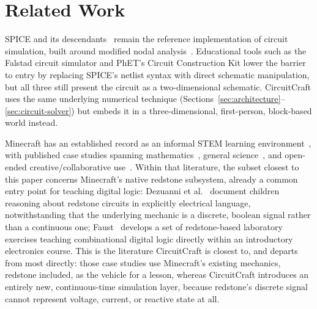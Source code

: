 \section{Related Work}
\label{sec:related-work}

SPICE and its descendants~\cite{nagel1973spice} remain the reference implementation of
circuit simulation, built around modified nodal analysis~\cite{ho1975mna}. Educational tools
such as the Falstad circuit simulator and PhET's Circuit Construction Kit lower the barrier
to entry by replacing SPICE's netlist syntax with direct schematic manipulation, but all
three still present the circuit as a two-dimensional schematic. CircuitCraft uses the same
underlying numerical technique (Sections~\ref{sec:architecture}--\ref{sec:circuit-solver})
but embeds it in a three-dimensional, first-person, block-based world instead.

Minecraft has an established record as an informal STEM learning
environment~\cite{nebel2016mining,sitzmann2011meta}, with published case studies spanning
mathematics~\cite{bos2014mathematics}, general science~\cite{short2012teaching}, and
open-ended creative/collaborative use~\cite{cipollone2014creative,callaghan2016investigating}.
Within that literature, the subset closest to this paper concerns Minecraft's native redstone
subsystem, already a common entry point for teaching digital logic: Dezuanni et
al.~\cite{dezuanni2015redstone} document children reasoning about redstone circuits in
explicitly electrical language, notwithstanding that the underlying mechanic is a discrete,
boolean signal rather than a continuous one; Faust~\cite{faust2024minecraft} develops a set of
redstone-based laboratory exercises teaching combinational digital logic directly within an
introductory electronics course. This is the literature CircuitCraft is closest
to, and departs from most directly: those case studies use Minecraft's existing mechanics,
redstone included, as the vehicle for a lesson, whereas CircuitCraft introduces an entirely
new, continuous-time simulation layer, because redstone's discrete signal cannot represent
voltage, current, or reactive state at all.

